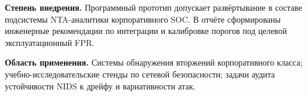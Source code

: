 \textbf{Степень внедрения.} Программный прототип допускает развёртывание
в составе подсистемы NTA-аналитики корпоративного SOC. В отчёте
сформированы инженерные рекомендации по интеграции и калибровке
порогов под целевой эксплуатационный FPR.

\textbf{Область применения.} Системы обнаружения вторжений
корпоративного класса; учебно-исследовательские стенды по сетевой
безопасности; задачи аудита устойчивости NIDS к дрейфу и
вариативности атак.
